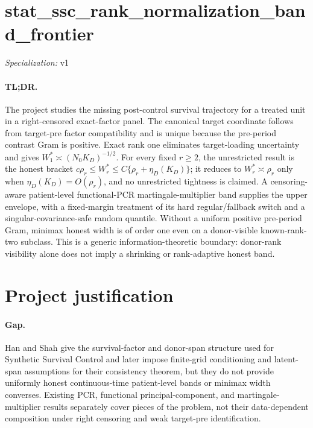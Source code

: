 \documentclass{article}
\begin{document}
\sloppy

\section*{stat\_\allowbreak{}ssc\_\allowbreak{}rank\_\allowbreak{}normalization\_\allowbreak{}band\_\allowbreak{}frontier}

\noindent\textit{Specialization:} v1\par

\paragraph{TL;DR.} The project studies the missing post-control survival trajectory for a treated unit in a right-censored exact-factor panel. The canonical target coordinate follows from target-pre factor compatibility and is unique because the pre-period contrast Gram is positive. Exact rank one eliminates target-loading uncertainty and gives \(W_1^*\asymp(N_0K_D)^{-1/2}\). For every fixed \(r\ge2\), the unrestricted result is the honest bracket \(c\rho_r\le W_r^*\le C\{\rho_r+\eta_D(K_D)\}\); it reduces to \(W_r^*\asymp\rho_r\) only when \(\eta_D(K_D)=O(\rho_r)\), and no unrestricted tightness is claimed. A censoring-aware patient-level functional-PCR martingale-multiplier band supplies the upper envelope, with a fixed-margin treatment of its hard regular/fallback switch and a singular-covariance-safe random quantile. Without a uniform positive pre-period Gram, minimax honest width is of order one even on a donor-visible known-rank-two subclass. This is a generic information-theoretic boundary: donor-rank visibility alone does not imply a shrinking or rank-adaptive honest band.

\section{Project justification}

\paragraph{Gap.} Han and Shah give the survival-factor and donor-span structure used for Synthetic Survival Control and later impose finite-grid conditioning and latent-span assumptions for their consistency theorem, but they do not provide uniformly honest continuous-time patient-level bands or minimax width converses. Existing PCR, functional principal-component, and martingale-multiplier results separately cover pieces of the problem, not their data-dependent composition under right censoring and weak target-pre identification.
\end{document}
